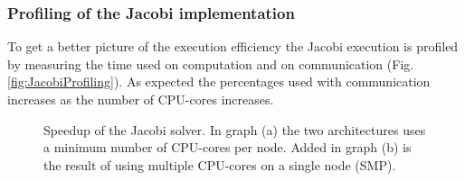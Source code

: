 \documentclass{sigplanconf}
\begin{document}
\subsubsection{Profiling of the Jacobi implementation}

To get a better picture of the execution efficiency the Jacobi execution is profiled by measuring the time used on computation and on communication (Fig. \ref{fig:JacobiProfiling}). As expected the percentages used with communication increases as the number of CPU-cores increases. 



\begin{figure}[t]%
  \begin{center}%
    \caption{Speedup of the Jacobi solver. In graph (a) the two architectures uses a minimum number of CPU-cores per node. Added in graph (b) is the result of using multiple CPU-cores on a single node (SMP).}%
    \label{fig:JacobiScale}%
  \end{center}
\end{figure}
\end{document}
